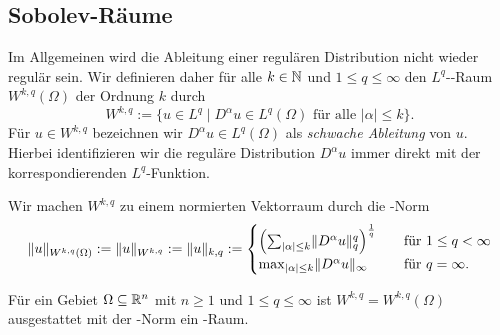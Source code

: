 \subsection{Sobolev-Räume}

Im Allgemeinen wird die Ableitung einer regulären Distribution nicht wieder regulär sein.
Wir definieren daher für alle $k \in \mathbb{N}$ und $1 \leq q \leq \infty$ den $L^q$\hyp{}\sobolev\hyp{}Raum $W^{k,q}(\Omega)$ der Ordnung $k$ durch
$$
W^{k,q} := \{ u \in L^q \mid D^\alpha u \in L^q(\Omega) \text{ für alle } |\alpha| \leq k\}.
$$
Für $u \in W^{k,q}$ bezeichnen wir $D^\alpha u \in L^q(\Omega)$ als \emph{schwache Ableitung} von $u$.
Hierbei identifizieren wir die reguläre Distribution $D^\alpha u$ immer direkt mit der korrespondierenden $L^q$\hyp{}Funktion.

Wir machen $W^{k,q}$ zu einem normierten Vektorraum durch die \sobolev\hyp{}Norm
$$
  \lVert u \rVert_{W^{k,q}(\Omega)} 
  := \lVert u \rVert_{W^{k,q}} 
  := \lVert u \rVert_{k,q} 
  := \begin{cases} 
    \left(\sum_{|\alpha| \leq k} \lVert D^\alpha u \rVert_q^q \right)^\frac{1}{q}\quad&\text{für } 1 \leq q < \infty \\
    \max_{|\alpha| \leq k} \lVert D^\alpha u \rVert_\infty \quad&\text{für }q = \infty.
    \end{cases}
$$

\begin{lem}
  Für ein Gebiet $\Omega \subseteq \mathbb{R}^n$ mit $n \geq 1$ und $1 \leq q \leq \infty$ ist $W^{k,q} = W^{k,q}(\Omega)$ ausgestattet mit der \sobolev\hyp{}Norm ein \banach\hyp{}Raum.
\end{lem}

